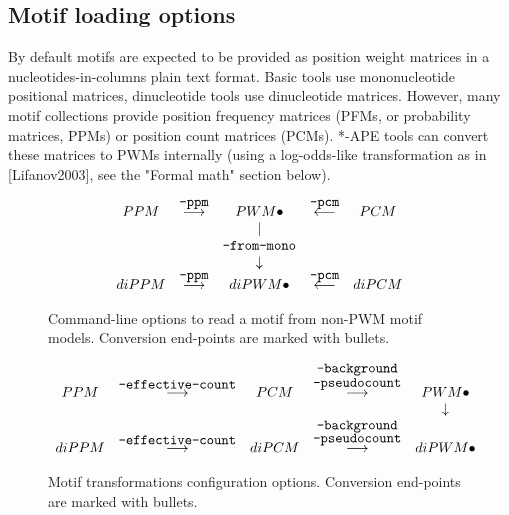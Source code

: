 \subsection{Motif loading options}
By default motifs are expected to be provided as position weight matrices in a nucleotides-in-columns plain text format. Basic tools use mononucleotide positional matrices, dinucleotide tools use dinucleotide matrices. However, many motif collections provide position frequency matrices (PFMs, or probability matrices, PPMs) or position count matrices (PCMs). *-APE tools can convert these matrices to PWMs internally (using a log-odds-like transformation as in [Lifanov2003], see the "Formal math" section below).


\begin{figure}[h]
\centering
$$\begin{array}{ccccc}
PPM     &  \stackrel{\mbox{\texttt{--ppm}}}{\longrightarrow}  & PWM \bullet               & \stackrel{\mbox{\texttt{--pcm}}}{\longleftarrow}  &  PCM  \\
        &                                                 &          |                &                                               &  \\
        &                                                 & \mbox{\texttt{--from-mono}}   &                                               &  \\
        &                                                 &     \downarrow            &                                               &  \\
diPPM   &  \stackrel{\mbox{\texttt{--ppm}}}{\longrightarrow}  & diPWM \bullet             & \stackrel{\mbox{\texttt{--pcm}}}{\longleftarrow}  &  diPCM
\end{array}$$
\caption{Command-line options to read a motif from non-PWM motif models. Conversion end-points are marked with bullets.}\label{motif-conversion-types}
\end{figure}


\begin{figure}[h]
\centering
$$\begin{array}{ccccc}
PPM   & \stackrel{\mbox{\texttt{--effective-count}}}{\longrightarrow} & PCM   & \stackrel{\mbox{\texttt{--background}}}{\stackrel{\mbox{\texttt{--pseudocount}}}{\longrightarrow}} & PWM \bullet \\
      &                                                           &       &                                                                                            & \downarrow \\
diPPM & \stackrel{\mbox{\texttt{--effective-count}}}{\longrightarrow} & diPCM & \stackrel{\stackrel{\mbox{\texttt{--background}}}{\mbox{\texttt{--pseudocount}}}}{\longrightarrow} & diPWM \bullet
\end{array}$$
\caption{Motif transformations configuration options. Conversion end-points are marked with bullets.}\label{motif-conversion-configuration}
\end{figure}


